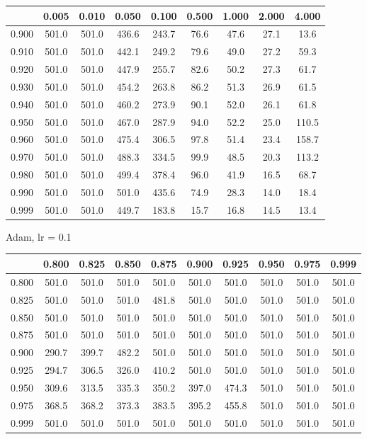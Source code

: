 \documentclass[a4paper,14pt,oneside,openany]{memoir}
\begin{document}
	\begin{tabular}{|c|c|c|c|c|c|c|c|c|}
	\hline 
	 &0.005 &0.010 &0.050 &0.100 &0.500 &1.000 &2.000 &4.000 \\
	 \hline 
	0.900 &501.0 &501.0 &436.6 &243.7 &76.6 &47.6 &27.1 &13.6 \\
	 \hline 
	0.910 &501.0 &501.0 &442.1 &249.2 &79.6 &49.0 &27.2 &59.3 \\
	 \hline 
	0.920 &501.0 &501.0 &447.9 &255.7 &82.6 &50.2 &27.3 &61.7 \\
	 \hline 
	0.930 &501.0 &501.0 &454.2 &263.8 &86.2 &51.3 &26.9 &61.5 \\
	 \hline 
	0.940 &501.0 &501.0 &460.2 &273.9 &90.1 &52.0 &26.1 &61.8 \\
	 \hline 
	0.950 &501.0 &501.0 &467.0 &287.9 &94.0 &52.2 &25.0 &110.5 \\
	 \hline 
	0.960 &501.0 &501.0 &475.4 &306.5 &97.8 &51.4 &23.4 &158.7 \\
	 \hline 
	0.970 &501.0 &501.0 &488.3 &334.5 &99.9 &48.5 &20.3 &113.2 \\
	 \hline 
	0.980 &501.0 &501.0 &499.4 &378.4 &96.0 &41.9 &16.5 &68.7 \\
	 \hline 
	0.990 &501.0 &501.0 &501.0 &435.6 &74.9 &28.3 &14.0 &18.4 \\
	 \hline 
	0.999 &501.0 &501.0 &449.7 &183.8 &15.7 &16.8 &14.5 &13.4 \\
	 \hline 
	
	\end{tabular}
	
	Adam, lr = 0.1 
	
	\begin{tabular}{|c|c|c|c|c|c|c|c|c|c|}
	\hline 
	 &0.800 &0.825 &0.850 &0.875 &0.900 &0.925 &0.950 &0.975 &0.999 \\
	 \hline 
	0.800 &501.0 &501.0 &501.0 &501.0 &501.0 &501.0 &501.0 &501.0 &501.0 \\
	 \hline 
	0.825 &501.0 &501.0 &501.0 &481.8 &501.0 &501.0 &501.0 &501.0 &501.0 \\
	 \hline 
	0.850 &501.0 &501.0 &501.0 &501.0 &501.0 &501.0 &501.0 &501.0 &501.0 \\
	 \hline 
	0.875 &501.0 &501.0 &501.0 &501.0 &501.0 &501.0 &501.0 &501.0 &501.0 \\
	 \hline 
	0.900 &290.7 &399.7 &482.2 &501.0 &501.0 &501.0 &501.0 &501.0 &501.0 \\
	 \hline 
	0.925 &294.7 &306.5 &326.0 &410.2 &501.0 &501.0 &501.0 &501.0 &501.0 \\
	 \hline 
	0.950 &309.6 &313.5 &335.3 &350.2 &397.0 &474.3 &501.0 &501.0 &501.0 \\
	 \hline 
	0.975 &368.5 &368.2 &373.3 &383.5 &395.2 &455.8 &501.0 &501.0 &501.0 \\
	 \hline 
	0.999 &501.0 &501.0 &501.0 &501.0 &501.0 &501.0 &501.0 &501.0 &501.0 \\
	 \hline 
	
	\end{tabular}
	
\end{document}
